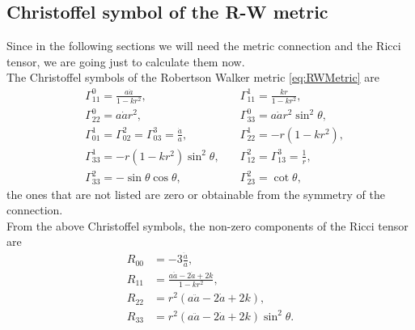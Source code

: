 \subsection{Christoffel symbol of the R-W metric}
Since in the following sections we will need the metric connection and the Ricci tensor, we are going just to calculate them now.\\
The Christoffel symbols of the Robertson Walker metric \eqref{eq:RWMetric} are
\begin{align}
    &\Gamma^0_{11}=\frac{a\dot{a}}{1-kr^2}, \quad&\Gamma^1_{11}=\frac{kr}{1-kr^2},\nonumber\\&\Gamma^0_{22}=a\dot{a}r^2, \quad&\Gamma^0_{33}=a\dot{a}r^2\sin^2\theta,\nonumber\\&\Gamma^1_{01}=\Gamma^2_{02}=\Gamma^3_{03}=\frac{\dot{a}}{a}, \quad &\Gamma^1_{22}=-r(1-kr^2),\nonumber\\&\Gamma^1_{33}=-r(1-kr^2)\sin^2\theta, \quad &\Gamma^2_{12}=\Gamma^3_{13}=\frac{1}{r},\nonumber\\&\Gamma^2_{33}=-\sin\theta\cos\theta, \quad &\Gamma^2_{23}=\cot\theta,\label{eq:RWChristoffel}
\end{align}
the ones that are not listed are zero or obtainable from the symmetry of the connection.\\
From the above Christoffel symbols, the non-zero components of the Ricci tensor are
\begin{align}
    R_{00}&=-3\frac{\ddot a}{a},\nonumber\\
    R_{11}&=\frac{a\ddot{a}-2\dot a+2k}{1-kr^2},\nonumber\\
    R_{22}&=r^2(a\ddot{a}-2\dot a+2k),\nonumber\\
    R_{33}&=r^2(a\ddot{a}-2\dot a+2k)\sin^2\theta.\label{eq:RWRicci}
\end{align}